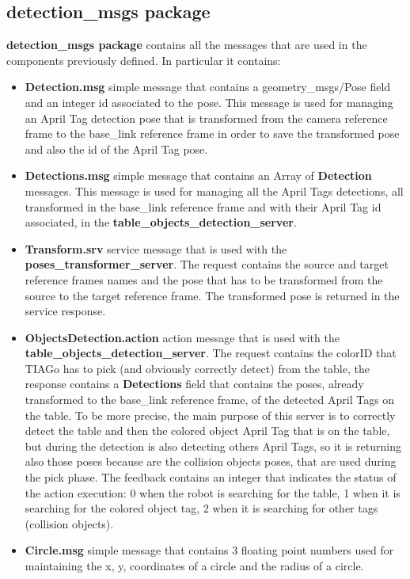 \subsection{detection\_msgs package}
\textbf{detection\_msgs package} contains all the messages that are used in the components previously defined. In particular it contains:
\begin{itemize}
    \item \textbf{Detection.msg} simple message that contains a geometry\_msgs/Pose field and an integer id associated to the pose. This message is used for managing an April Tag detection pose that is transformed from the camera reference frame to the base\_link reference frame in order to save the transformed pose and also the id of the April Tag pose. 
    \item \textbf{Detections.msg} simple message that contains an Array of \textbf{Detection} messages. This message is used for managing all the April Tags detections, all transformed in the base\_link reference frame and with their April Tag id associated, in the \textbf{table\_objects\_detection\_server}. 
    \item \textbf{Transform.srv} service message that is used with the \textbf{poses\_transformer\_server}. The request contains the source and target reference frames names and the pose that has to be transformed from the source to the target reference frame. The transformed pose is returned in the service response.
     \item \textbf{ObjectsDetection.action} action message that is used with the \\ \textbf{table\_objects\_detection\_server}. The request contains the colorID that TIAGo has to pick (and obviously correctly detect) from the table, the response contains a \textbf{Detections} field that contains the poses, already transformed to the base\_link reference frame, of the detected April Tags on the table. To be more precise, the main purpose of this server is to correctly detect the table and then the colored object April Tag that is on the table, but during the detection is also detecting others April Tags, so it is returning also those poses because are the collision objects poses, that are used during the pick phase. The feedback contains an integer that indicates the status of the action execution: 0 when the robot is searching for the table, 1 when it is searching for the colored object tag, 2 when it is searching for other tags (collision objects). 
     \item \textbf{Circle.msg} simple message that contains 3 floating point numbers used for maintaining the x, y, coordinates of a circle and the radius of a circle.

\end{itemize}
